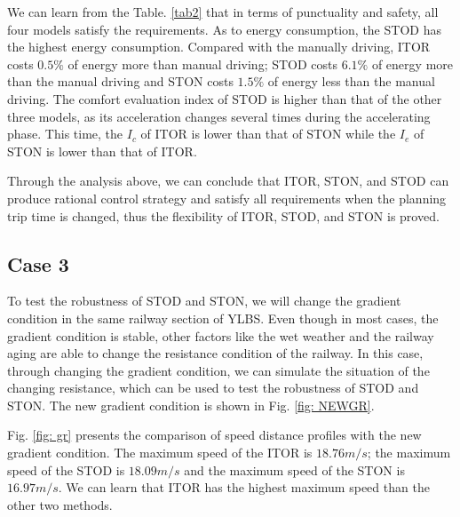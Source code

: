 \documentclass[journal]{IEEEtran}
\begin{document}
\par We can learn from the Table. \ref{tab2} that in terms of punctuality and safety, all four models satisfy the requirements. As to energy consumption, the STOD has the highest energy consumption. Compared with the manually driving,  ITOR costs $0.5\%$ of energy more than manual driving; STOD costs $6.1\%$ of energy more than the manual driving and STON costs $1.5\%$ of energy less than the manual driving. The comfort evaluation index of STOD is higher than that of the other three models, as its acceleration changes several times during the accelerating phase. This time, the $I_c$ of ITOR is lower than that of STON while the $I_e$ of STON is lower than that of ITOR.

\par Through the analysis above, we can conclude that ITOR, STON, and STOD can produce rational control strategy and satisfy all requirements when the planning trip time is changed, thus the flexibility of ITOR, STOD, and STON is proved.


\subsection{Case 3}
To test the robustness of STOD and STON, we will change the gradient condition in the same railway section of YLBS. Even though in most cases, the gradient condition is stable, other factors like the wet weather and the railway aging are able to change the resistance condition of the railway. In this case, through changing the gradient condition, we can simulate the situation of the changing resistance, which can be used to test the robustness of STOD and STON. The new gradient condition is shown in Fig. \ref{fig: NEWGR}.

\par Fig. \ref{fig: gr} presents the comparison of speed distance profiles with the new gradient condition. The maximum speed of the ITOR is $18.76m/s$; the maximum speed of the STOD is $18.09m/s$ and the maximum speed of the STON is $16.97m/s$. We can learn that ITOR has the highest maximum speed than the other two methods. 
\end{document}

